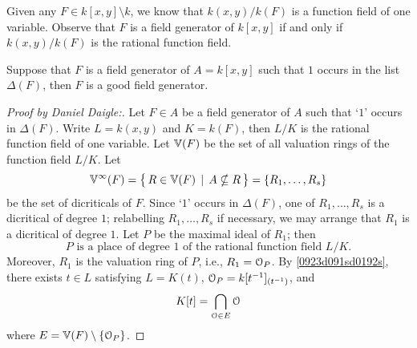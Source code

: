 \begin{remark}
	Given any $F \in  k[x,y] \setminus  k$, we know that
	$ k(x,y) /  k(F)$ is a function field
	of one variable. Observe that $F$ is a field generator 
	of $ k[x,y]$ if and only if 
	$ k(x,y) /  k(F)$ is the rational function field.
\end{remark}

\begin{proposition}
	Suppose that $F$ is a field generator of $A= k[x,y]$ 
	such that $1$ occurs in the list $\Delta(F)$, then $F$ is a 
	good field generator.
\end{proposition}

\begin{proof}[Proof by Daniel Daigle:]
	Let $F \in A$ be a field generator of $A$ such that 
	`$1$' occurs in $\Delta(F)$.
	Write $L =  k(x,y)$ and $K =  k(F)$, then $L/K$ is the 
	rational function field of one variable.
	Let $\mathbb{V}(F)$ be the set of all valuation rings of the 
	function field $L/K$.
	Let 
	$$
	\mathbb{V}^\infty(F) = \big\{\, R \in \mathbb{V}(F) \, \mid \, A \nsubseteq R \, \big\} = \{ R_1, \dots, R_s \}
	$$
	be the set of dicriticals of $F$. Since `$1$' occurs in
	$\Delta(F)$, one of $R_1, \dots, R_s$
	is a dicritical of degree $1$; relabelling  $R_1, \dots, R_s$ 
	if necessary, we may arrange that
	$R_1$ is a dicritical of degree $1$. Let  $P$ be the maximal 
	ideal of $R_1$; then
	$$
	\text{$P$ is a place of degree $1$ of the rational function field $L/K$.}
	$$
	Moreover, $R_1$ is the valuation ring of $P$, i.e., $R_1 = \EuScript{O}_P$.
	By \ref{0923d091sd0192s}, there exists $t \in L$ satisfying
	$L = K(t)$, $\EuScript{O}_P =  k[ t^{-1} ]_{(t^{-1})}$, and
	\begin{equation} \label {uqid7623erih9we8}
	K[t] = \bigcap_{\EuScript{O} \in E} \EuScript{O}
	\end{equation}
	where $E = \mathbb{V}(F) \setminus \{ \EuScript{O}_P \}$.


\end{proof}
